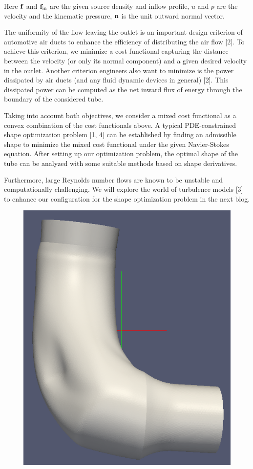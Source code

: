 \documentclass{article}
\numberwithin{equation}{section}
\begin{document}
Here ${\bf f}$ and ${\bf f}_{\rm in}$ are the given source density and inflow profile, $u$ and $p$ are the velocity and the kinematic pressure, ${\bf n}$ is the unit outward normal vector.

The uniformity of the flow leaving the outlet is an important design criterion of automotive air ducts to enhance the efficiency of distributing the air flow [2]. To achieve this criterion, we minimize a cost functional capturing the distance between the velocity (or only its normal component) and a given desired velocity in the outlet. Another criterion engineers also want to minimize is the power dissipated by air ducts (and any fluid dynamic devices in general) [2]. This dissipated power can be computed as the net inward flux of energy through the boundary of the considered tube.

Taking into account both objectives, we consider a mixed cost functional as a convex combination of the  cost functionals above. A typical PDE-constrained shape optimization problem [1, 4] can be established by finding an admissible shape to minimize the mixed cost functional under the given Navier-Stokes equation. After setting up our optimization problem, the optimal shape of the tube can be analyzed with some suitable methods based on shape derivatives.

Furthermore, large Reynolds number flows are known to be unstable and computationally challenging. We will explore the world of turbulence models [3] to enhance our configuration for the shape optimization problem in the next blog.

\begin{figure}[h]
    \centering
    \includegraphics[scale=0.3]{tube_iteration_30}
\end{figure}
\end{document}
